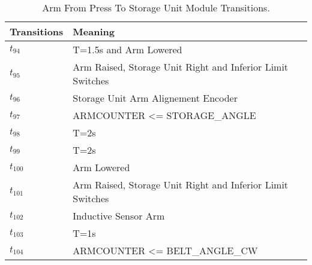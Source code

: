 \begin{table}[H]
\caption{Arm From Press To Storage Unit Module Transitions.}
\centering
\begin{tabular}{M{5cm}M{10cm}}
Transitions & Meaning\\
\hline
\hyperlink{partialNet:tt94}{\hypertarget{partialTable:tt94}{$t_{94}$}} & T=1.5s and Arm Lowered\\
\hyperlink{partialNet:t95}{\hypertarget{partialTable:t95}{$t_{95}$}} & Arm Raised, Storage Unit Right and Inferior Limit Switches\\
\hyperlink{partialNet:t96}{\hypertarget{partialTable:t96}{$t_{96}$}} & Storage Unit Arm Alignement Encoder\\
\hyperlink{partialNet:t97}{\hypertarget{partialTable:t97}{$t_{97}$}} & ARMCOUNTER <= STORAGE\_ANGLE\\
\hyperlink{partialNet:tt98}{\hypertarget{partialTable:tt98}{$t_{98}$}} & T=2s\\
\hyperlink{partialNet:tt99}{\hypertarget{partialTable:tt99}{$t_{99}$}} & T=2s\\
\hyperlink{partialNet:t100}{\hypertarget{partialTable:t100}{$t_{100}$}} & Arm Lowered\\
\hyperlink{partialNet:t101}{\hypertarget{partialTable:t101}{$t_{101}$}} & Arm Raised, Storage Unit Right and Inferior Limit Switches\\
\hyperlink{partialNet:t102}{\hypertarget{partialTable:t102}{$t_{102}$}} & Inductive Sensor Arm\\
\hyperlink{partialNet:tt103}{\hypertarget{partialTable:tt103}{$t_{103}$}} & T=1s\\
\hyperlink{partialNet:t104}{\hypertarget{partialTable:t104}{$t_{104}$}} & ARMCOUNTER <= BELT\_ANGLE\_CW\\
\end{tabular}
\end{table}
